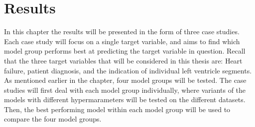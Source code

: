 \chapter{Results}

In this chapter the results will be presented in the form of three case studies. 
Each case study will focus on a single target variable, and aims to find which model group performs best at predicting the target variable in question.
Recall that the three target variables that will be considered in this thesis are: Heart failure, patient diagnosis, and the indication of individual left ventricle segments.
As mentioned earlier in the chapter, four model groups will be tested. 
The case studies will first deal with each model group individually, where variants of the models with different hypermarameters will be tested on the different datasets. 
Then, the best performing model within each model group will be used to compare the four model groups.




